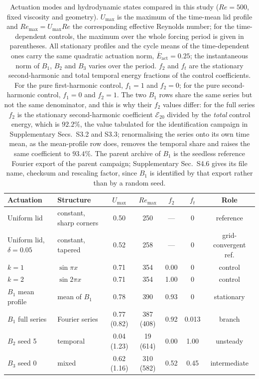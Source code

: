 \documentclass[11pt,a4paper]{article}
\begin{document}
\begin{table}[t]
\centering
\caption{Actuation modes and hydrodynamic states compared in this study
($Re=500$, fixed viscosity and geometry). $U_{\max}$ is the maximum of the
time-mean lid profile and $Re_{\max}=U_{\max}Re$ the corresponding effective
Reynolds number; for the time-dependent controls, the maximum over the whole
forcing period is given in parentheses. All stationary profiles and the cycle means of
the time-dependent ones carry the same quadratic actuation norm,
$\overline{E}_{\mathrm{act}}=0.25$; the instantaneous norm of $B_1$, $B_2$ and $B_3$
varies over the period. $f_2$ and $f_t$ are the stationary second-harmonic and
total temporal energy fractions of the control coefficients. For the pure
first-harmonic control, $f_1=1$ and $f_2=0$; for the pure second-harmonic control,
$f_1=0$ and $f_2=1$. The two $B_1$ rows share the same series but not the same
denominator, and this is why their $f_2$ values differ: for the full series $f_2$ is
the stationary second-harmonic coefficient $\mathcal{E}_{20}$ divided by the
\emph{total} control energy, which is $92.2\%$, the value tabulated for the
identification campaign in Supplementary Secs.~S3.2 and S3.3; renormalising the
series onto its own time mean, as the mean-profile row does, removes the temporal
share and raises the same coefficient to $93.4\%$. The parent archive of $B_1$ is
the seedless reference Fourier export of the parent campaign; Supplementary
Sec.~S4.6 gives its file name, checksum and rescaling factor, since $B_1$ is
identified by that export rather than by a random seed.}
\label{tab:modes}
\footnotesize
\setlength{\tabcolsep}{4pt}
\begin{tabular}{llccccc}
\toprule
Actuation & Structure & $U_{\max}$ & $Re_{\max}$ & $f_2$ & $f_t$ & Role\\
\midrule
Uniform lid & constant, sharp corners & 0.50 & 250 & --- & 0 & reference\\
Uniform lid, $\delta=0.05$ & constant, tapered & 0.52 & 258 & --- & 0 & grid-convergent ref.\\
$k=1$ & $\sin\pi x$ & 0.71 & 354 & 0.00 & 0 & control\\
$k=2$ & $\sin 2\pi x$ & 0.71 & 354 & 1.00 & 0 & control\\
$B_1$ mean profile & mean of $B_1$ & 0.78 & 390 & 0.93 & 0 & stationary\\
$B_1$ full series & Fourier series & 0.77 (0.82) & 387 (408) & 0.92 & 0.013 & branch\\
$B_2$ seed 5 & temporal & 0.04 (1.23) & 19 (614) & 0.00 & 1.00 & unsteady\\
$B_3$ seed 0 & mixed & 0.62 (1.16) & 310 (582) & 0.52 & 0.45 & intermediate\\
\bottomrule
\end{tabular}
\end{table}
\end{document}
